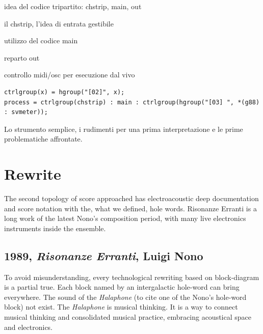 \documentclass[twoside,a4paper]{article}
\begin{document}
idea del codice tripartito: chstrip, main, out

il chstrip, l'idea di entrata gestibile

utilizzo del codice main

reparto out

controllo midi/osc per esecuzione dal vivo

\begin{lstlisting}
ctrlgroup(x) = hgroup("[02]", x);
process = ctrlgroup(chstrip) : main : ctrlgroup(hgroup("[03] ", *(g88) : svmeter));
\end{lstlisting}

Lo strumento semplice, i rudimenti per una prima interpretazione e le prime problematiche affrontate. 


\section{Rewrite}
\label{sec:rewriting}

The second topology of score approached has electroacoustic deep documentation and score notation with the, what we defined, hole words. Risonanze Erranti is a long work of the latest Nono's composition period, with many live electronics instruments inside the ensemble. 


\subsection{1989, \emph{Risonanze Erranti}, Luigi Nono}

To avoid misunderstanding, every technological rewriting based on block-diagram is a partial true. Each block named by an intergalactic hole-word can bring everywhere. The sound of the \emph{Halaphone} (to cite one of the Nono's hole-word block) not exist. The \emph{Halaphone} is musical thinking. It is a way to connect musical thinking and consolidated musical practice, embracing acoustical space and electronics. 
\end{document}
